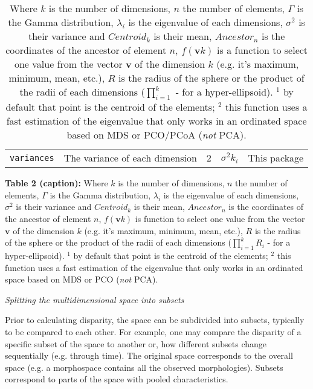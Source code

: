 \documentclass[12pt,letterpaper]{article}
\renewcommand{\subsection}[1]{%
\bigskip
\begin{center}
\begin{large}
\normalfont\itshape #1
\end{large}
\end{center}}
\begin{document}
\begin{table}[H]
{\begin{tabular}{p{2cm}|p{5cm}|p{1cm}|p{5cm}|p{5cm}}
        \hline
        \texttt{variances} & The variance of each dimension & 2 & $\sigma^{2}{k_i}$ & This package \\
    \end{tabular}
}%
    \caption{\small{Where $k$ is the number of dimensions, $n$ the number of elements, $\Gamma$ is the Gamma distribution, $\lambda_i$ is the eigenvalue of each dimensions, $\sigma^{2}$ is their variance and $Centroid_{k}$ is their mean, $Ancestor_{n}$ is the coordinates of the ancestor of element $n$, $f(\mathbf{v}k)$ is a function to select one value from the vector $\mathbf{v}$ of the dimension $k$ (e.g. it's maximum, minimum, mean, etc.), $R$ is the radius of the sphere or the product of the radii of each dimensions ($\displaystyle\prod_{i=1}^{k}$ - for a hyper-ellipsoid). $^1$ by default that point is the centroid of the elements; $^2$ this function uses a fast estimation of the eigenvalue that only works in an ordinated space based on MDS or PCO/PCoA (\textit{not} PCA).}}
    \label{Tab:metrics}
\end{table}

\textbf{Table 2 (caption):} Where $k$ is the number of dimensions, $n$ the number of elements, $\Gamma$ is the Gamma distribution, $\lambda_i$ is the eigenvalue of each dimensions, $\sigma^{2}$ is their variance and $Centroid_{k}$ is their mean, $Ancestor_{n}$ is the coordinates of the ancestor of element $n$, $f(\mathbf{v}k)$ is function to select one value from the vector $\mathbf{v}$ of the dimension $k$ (e.g. it's maximum, minimum, mean, etc.), $R$ is the radius of the sphere or the product of the radii of each dimensions ($\displaystyle\prod_{i=1}^{k}R_{i}$ - for a hyper-ellipsoid). $^1$ by default that point is the centroid of the elements; $^2$ this function uses a fast estimation of the eigenvalue that only works in an ordinated space based on MDS or PCO (\textit{not} PCA).


\subsection{Splitting the multidimensional space into subsets}
Prior to calculating disparity, the space can be subdivided into subsets, typically to be compared to each other.
For example, one may compare the disparity of a specific subset of the space to another or, how different subsets change sequentially (e.g. through time).
The original space corresponds to the overall space (e.g. a morphospace contains all the observed morphologies).
Subsets correspond to parts of the space with pooled characteristics.
\end{document}
